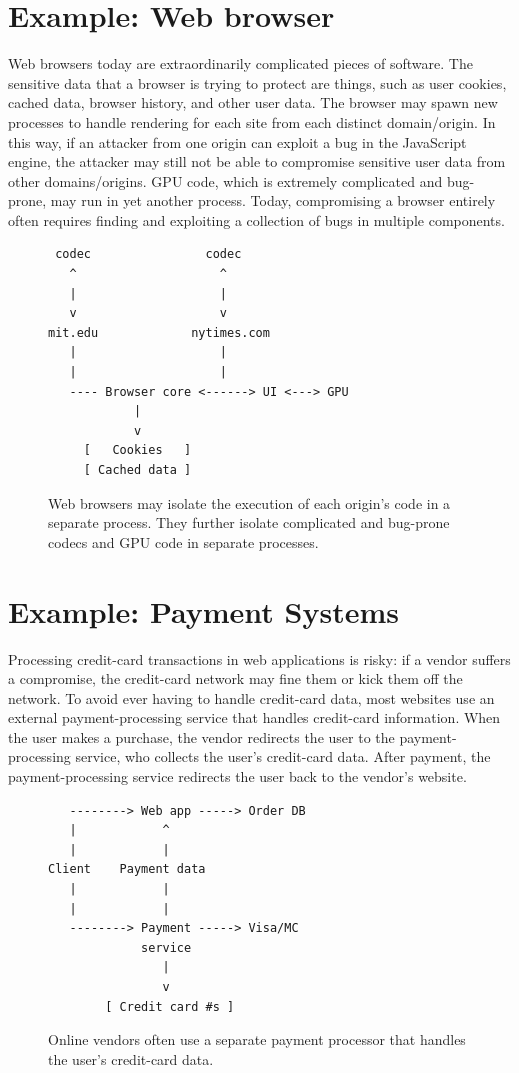 \section{Example: Web browser}
\label{sec:webbrowser}

Web browsers today are extraordinarily complicated pieces of software.
The sensitive data that a browser is trying to protect are things, such as
user cookies, cached data, browser history, and other user data.
The browser may spawn new processes to handle rendering for each site
from each distinct domain/origin.
In this way, if an attacker from one origin can exploit a bug in the
JavaScript engine, the attacker may still not be able to compromise
sensitive user data from other domains/origins.
GPU code, which is extremely complicated and bug-prone, may run in 
yet another process.
Today, compromising a browser entirely often requires finding and exploiting
a collection of bugs in multiple components.
\begin{figure}
\begin{verbatim}
 codec                codec
   ^                    ^
   |                    |
   v                    v
mit.edu             nytimes.com
   |                    |
   |                    | 
   ---- Browser core <------> UI <---> GPU
            |
            v
     [   Cookies   ]
     [ Cached data ]
\end{verbatim}
\caption{Web browsers may isolate the execution of each origin's 
  code in a separate process. They further isolate complicated
  and bug-prone codecs and GPU code in separate processes.}
\end{figure}

\section{Example: Payment Systems}
Processing credit-card transactions in web applications is risky:
if a vendor suffers a compromise, the credit-card network may fine
them or kick them off the network.
To avoid ever having to handle credit-card data, most websites 
use an external payment-processing service that handles credit-card information.
When the user makes a purchase, the vendor redirects the user to the 
payment-processing service, who collects the user's credit-card data.
After payment, the payment-processing service redirects the user
back to the vendor's website.

\begin{figure}
\begin{verbatim}
   --------> Web app -----> Order DB
   |            ^
   |            |
Client    Payment data 
   |            |
   |            |
   --------> Payment -----> Visa/MC
             service   
                | 
                v
        [ Credit card #s ]
\end{verbatim}
\caption{Online vendors often use a separate payment processor
    that handles the user's credit-card data.}
\end{figure}
